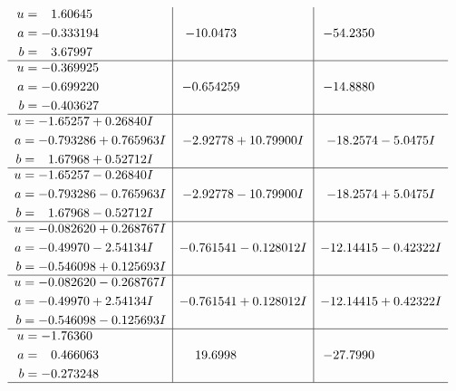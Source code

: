\documentclass[1p]{elsarticle_modified}
\theoremstyle{definition}
\begin{document}
$$\begin{array}{c|c|c}
\begin{aligned}
u &= \phantom{-}1.60645\phantom{ +0.000000I} \\
a &= -0.333194\phantom{ +0.000000I} \\
b &= \phantom{-}3.67997\phantom{ +0.000000I}\end{aligned}
 & -10.0473\phantom{ +0.000000I} & -54.2350\phantom{ +0.000000I} \\ \hline\begin{aligned}
u &= -0.369925\phantom{ +0.000000I} \\
a &= -0.699220\phantom{ +0.000000I} \\
b &= -0.403627\phantom{ +0.000000I}\end{aligned}
 & -0.654259\phantom{ +0.000000I} & -14.8880\phantom{ +0.000000I} \\ \hline\begin{aligned}
u &= -1.65257 + 0.26840 I \\
a &= -0.793286 + 0.765963 I \\
b &= \phantom{-}1.67968 + 0.52712 I\end{aligned}
 & -2.92778 + 10.79900 I & -18.2574 - 5.0475 I \\ \hline\begin{aligned}
u &= -1.65257 - 0.26840 I \\
a &= -0.793286 - 0.765963 I \\
b &= \phantom{-}1.67968 - 0.52712 I\end{aligned}
 & -2.92778 - 10.79900 I & -18.2574 + 5.0475 I \\ \hline\begin{aligned}
u &= -0.082620 + 0.268767 I \\
a &= -0.49970 - 2.54134 I \\
b &= -0.546098 + 0.125693 I\end{aligned}
 & -0.761541 - 0.128012 I & -12.14415 - 0.42322 I \\ \hline\begin{aligned}
u &= -0.082620 - 0.268767 I \\
a &= -0.49970 + 2.54134 I \\
b &= -0.546098 - 0.125693 I\end{aligned}
 & -0.761541 + 0.128012 I & -12.14415 + 0.42322 I \\ \hline\begin{aligned}
u &= -1.76360\phantom{ +0.000000I} \\
a &= \phantom{-}0.466063\phantom{ +0.000000I} \\
b &= -0.273248\phantom{ +0.000000I}\end{aligned}
 & \phantom{-}19.6998\phantom{ +0.000000I} & -27.7990\phantom{ +0.000000I}\\
 \hline 
 \end{array}$$\newpage\newpage\renewcommand{\arraystretch}{1}
\end{document}
